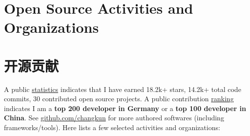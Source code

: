  {
  \section{\textbf{Open Source Activities and Organizations}}
}{
  \section{\textbf{开源贡献}}
}
\small A public \href{https://github-readme-stats.vercel.app/api?username=changkun&include_all_commits=true}{statistics} indicates that I have earned 18.2k+ stars, 14.2k+ total code commits, 30 contributed open source projects. A public contribution \href{https://github.com/gayanvoice/top-github-users/blob/858980e5cb10d1b4c27a24d36ae6547aa0f195cd/markdown/public_contributions/germany.md}{ranking} indicates I am a \textbf{top 200 developer in Germany} or a \textbf{top 100 developer in China}. See \href{https://github.com/changkun}{github.com/changkun} for more authored softwares (including frameworks/tools). Here lists a few selected activities and organizations:

